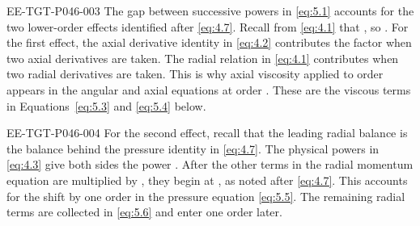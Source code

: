 \begin{EESegment}{EE-TGT-P046-003}
The gap  between successive powers in \eqref{eq:5.1} accounts for the two
lower-order effects identified after \eqref{eq:4.7}. Recall from \eqref{eq:4.1} that
, so
. For the first effect, the axial derivative identity in
\eqref{eq:4.2} contributes the factor
 when two axial derivatives are taken. The radial
relation  in \eqref{eq:4.1} contributes
 when two radial derivatives are taken. This is why axial viscosity
applied to order  appears in the angular and axial equations at order
. These are the  viscous terms in
Equations~\eqref{eq:5.3} and \eqref{eq:5.4} below.
\end{EESegment}

\begin{EESegment}{EE-TGT-P046-004}
For the second effect, recall that the leading radial balance
 is the balance behind the pressure
identity in \eqref{eq:4.7}. The physical powers in \eqref{eq:4.3} give both sides the power
. After the other terms in the radial momentum equation are
multiplied by , they begin at
, as noted after \eqref{eq:4.7}. This accounts for the
shift by one order in the pressure equation \eqref{eq:5.5}. The remaining radial terms are
collected in \eqref{eq:5.6} and enter one order later.
\end{EESegment}

